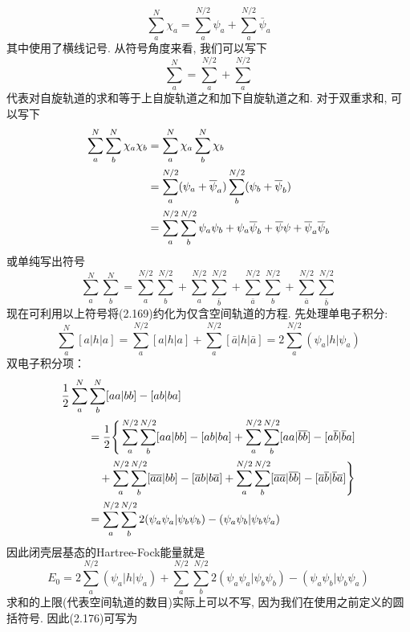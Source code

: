 \begin{equation}
\sum_{a}^{N} \chi_a = \sum_{a}^{N/2}\psi_a + \sum_{a}^{N/2}\bar{\psi}_a
\end{equation} 
其中使用了横线记号. 从符号角度来看, 我们可以写下
\begin{equation}
\sum_{a}^{N} = \sum_{a}^{N/2} + \sum_{a}^{N/2}
\end{equation}
代表对自旋轨道的求和等于上自旋轨道之和加下自旋轨道之和. 对于双重求和, 可以写下
\begin{align}
\sum_{a}^{N}\sum_{b}^{N}\chi_a\chi_b & = \sum_{a}^{N}\chi_a\sum_{b}^{N}\chi_b\notag\\
& = \sum_{a}^{N/2}(\psi_a + \bar{\psi}_a)\sum_{b}^{N/2}(\psi_b + \bar{\psi}_b) \notag\\ 
& = \sum_{a}^{N/2}\sum_{b}^{N/2}\psi_a\psi_b + \psi_a\bar{\psi}_b + \bar{\psi}{\psi} + \bar{\psi}_a\bar{\psi}_b 
\end{align}
或单纯写出符号
\begin{equation}
\sum_{a}^{N}\sum_{b}^{N} = \sum_{a}^{N/2}\sum_{b}^{N/2} + \sum_{a}^{N/2}\sum_{\bar{b}}^{N/2} + \sum_{\bar{a}}^{N/2}\sum_{b}^{N/2} + \sum_{\bar{a}}^{N/2}\sum_{\bar{b}}^{N/2}
\end{equation}
现在可利用以上符号将(2.169)约化为仅含空间轨道的方程. 先处理单电子积分:
\begin{equation}
\sum_{a}^{N}[a|h|a] = \sum_{a}^{N/2}[a|h|a] + \sum_{a}^{N/2}[\bar{a}|h|\bar{a}] = 2 \sum_{a}^{N/2}(\psi_a|h|\psi_a)
\end{equation}
双电子积分项：
\begin{align}
\frac{1}{2}\sum_{a}^{N} & \sum_{b}^{N}[aa|bb] - [ab|ba]\notag\\
& = \frac{1}{2}\Bigg\{ \sum_{a}^{N/2}\sum_{b}^{N/2}[aa|bb]-[ab|ba] + \sum_{a}^{N/2}\sum_{b}^{N/2}[aa|\bar{bb}] -[a\bar{b}|\bar{b}a]\notag \\   
& \quad + \sum_{a}^{N/2}\sum_{b}^{N/2}[\bar{aa}|bb] - [\bar{a}b|b\bar{a}] + \sum_{a}^{N/2}\sum_{b}^{N/2}[\bar{aa}|\bar{bb}] - [\bar{a}\bar{b}|\bar{b}\bar{a}] \Bigg\}\notag\\
& = \sum_{a}^{N/2}\sum_{b}^{N/2} 2 (\psi_a\psi_a|\psi_b\psi_b) - (\psi_a\psi_b|\psi_b\psi_a)
\end{align}
因此闭壳层基态的Hartree-Fock能量就是
\begin{equation}
E_0 = 2 \sum_{a}^{N/2}(\psi_a|h|\psi_a) + \sum_{a}^{N/2}\sum_{b}^{N/2}2(\psi_a\psi_a|\psi_b\psi_b) - (\psi_a\psi_b|\psi_b\psi_a)
\end{equation}
求和的上限(代表空间轨道的数目)实际上可以不写, 因为我们在使用之前定义的圆括符号. 因此(2.176)可写为
